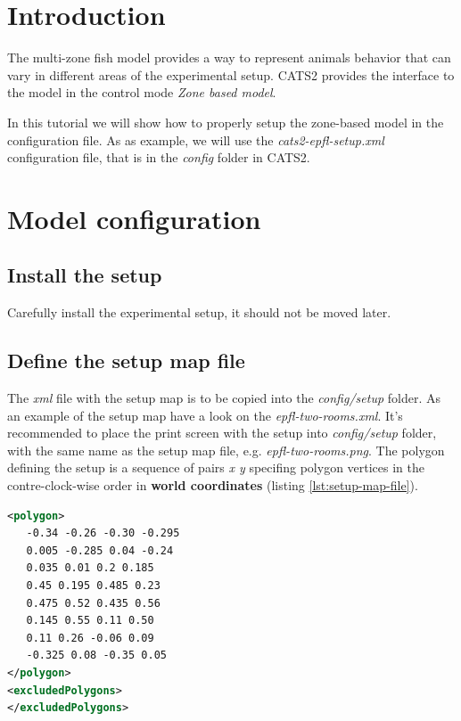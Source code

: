 \documentclass{styles/assisi}
\begin{document}

\lstset{
    language=xml,
    tabsize=3,
    xleftmargin=20pt,
    framexleftmargin=15pt,
    numbers=left,
    numberstyle=\tiny,
    numbersep=5pt,
    breaklines=true,
    showstringspaces=false,
    basicstyle=\footnotesize}

\chapter{Introduction}\label{chap:intro}
The multi-zone fish model provides a way to represent animals behavior that 
can vary in different areas of the experimental setup. CATS2 provides the interface to the model in the control mode {\it Zone based model}.

In this tutorial we will show how to properly setup the zone-based model in the configuration file. As as example, we will use the {\it cats2-epfl-setup.xml} configuration file, that is in the {\it config} folder in CATS2.

\chapter{Model configuration}\label{chap:intro}
\section{Install the setup}
Carefully install the experimental setup, it should not be moved later. 

\section{Define the setup map file}
The {\it xml} file with the setup map is to be copied into the {\it config/setup} folder. As an example of the setup map have a look on the {\it epfl-two-rooms.xml}. It's recommended to place the print screen with the setup into  {\it config/setup} folder, with the same name as the setup map file, e.g. {\it epfl-two-rooms.png}. The polygon defining the setup is a sequence of pairs {\it x y} specifing polygon vertices in the contre-clock-wise order in {\bf world coordinates} (listing \ref{lst:setup-map-file}). 

\begin{lstlisting}[caption={Setup map example from {\it epfl-two-rooms.xml}},label={lst:setup-map-file},language=xml]
<polygon>
   -0.34 -0.26 -0.30 -0.295
   0.005 -0.285 0.04 -0.24
   0.035 0.01 0.2 0.185
   0.45 0.195 0.485 0.23
   0.475 0.52 0.435 0.56
   0.145 0.55 0.11 0.50
   0.11 0.26 -0.06 0.09
   -0.325 0.08 -0.35 0.05
</polygon>
<excludedPolygons>
</excludedPolygons>
\end{lstlisting}
\end{document}
